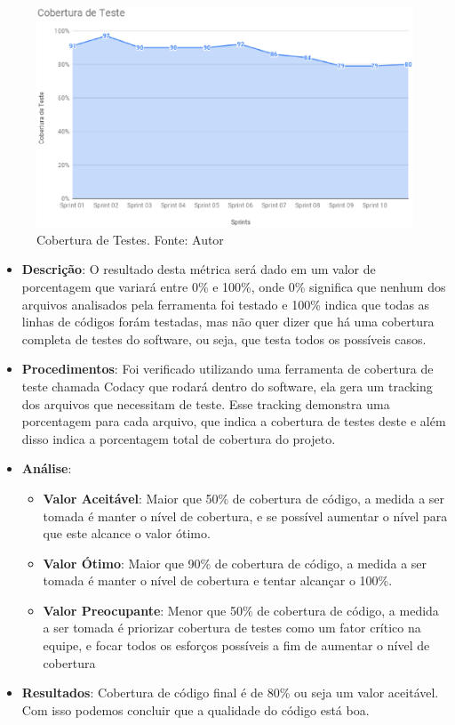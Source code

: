 \begin{figure}[h!]
	\centering
  \includegraphics[keepaspectratio=true,scale=0.5]{figuras/cobertura_de_testes.eps}
  \caption[Cobertura de Testes.]{Cobertura de Testes. Fonte: Autor}
	\label{fig:testes}
\end{figure}

\begin{itemize}
  \item \textbf{Descrição}: O resultado desta métrica será dado em um valor de porcentagem que variará entre 0\% e 100\%, onde 0\% significa que nenhum dos arquivos analisados pela ferramenta foi testado e 100\% indica que todas as linhas de códigos forám testadas, mas não quer dizer que há uma cobertura completa de testes do software, ou seja, que testa todos os possíveis casos.
  \item \textbf{Procedimentos}: Foi verificado utilizando uma ferramenta de cobertura de teste chamada Codacy que rodará dentro do software, ela gera um tracking dos arquivos que necessitam de teste. Esse tracking demonstra uma porcentagem para cada arquivo, que indica a cobertura de testes deste e além disso indica a porcentagem total de cobertura do projeto.
  \item \textbf{Análise}:
    \begin{itemize}
      \item \textbf{Valor Aceitável}: Maior que 50\% de cobertura de código, a medida a ser tomada é manter o nível de cobertura, e se possível aumentar o nível para que este alcance o valor ótimo.
      \item \textbf{Valor Ótimo}: Maior que 90\% de cobertura de código, a medida a ser tomada é manter o nível de cobertura e tentar alcançar o 100\%.
      \item \textbf{Valor Preocupante}: Menor que 50\% de cobertura de código, a medida a ser tomada é priorizar cobertura de testes como um fator crítico na equipe, e focar todos os esforços possíveis a fim de aumentar o nível de cobertura
    \end{itemize}
  \item \textbf{Resultados}: Cobertura de código final é de 80\% ou seja um valor aceitável. Com isso podemos concluir que a qualidade do código está boa.
\end{itemize}

